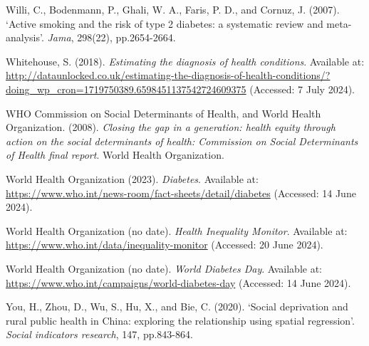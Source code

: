 \begin{Reference}
\begin{flushleft}
Willi, C., Bodenmann, P., Ghali, W. A., Faris, P. D., and Cornuz, J. (2007). `Active smoking and the risk of type 2 diabetes: a systematic review and meta-analysis'. \textit{Jama}, 298(22), pp.2654-2664.
\end{flushleft}
\vspace{2pt}


\begin{flushleft}
Whitehouse, S. (2018). \textit{Estimating the diagnosis of health conditions}. Available at: \url{http://dataunlocked.co.uk/estimating-the-diagnosis-of-health-conditions/?doing_wp_cron=1719750389.6598451137542724609375} (Accessed: 7 July 2024).
\end{flushleft}
\vspace{2pt}


\begin{flushleft}
WHO Commission on Social Determinants of Health, and World Health Organization. (2008). \textit{Closing the gap in a generation: health equity through action on the social determinants of health: Commission on Social Determinants of Health final report}. World Health Organization.
\end{flushleft}
\vspace{2pt}


\begin{flushleft}
World Health Organization (2023). \textit{Diabetes}. Available at: \url{https://www.who.int/news-room/fact-sheets/detail/diabetes} (Accessed: 14 June 2024).
\end{flushleft}
\vspace{2pt}


\begin{flushleft}
World Health Organization (no date). \textit{Health Inequality Monitor}. Available at: \url{https://www.who.int/data/inequality-monitor} (Accessed: 20 June 2024).
\end{flushleft}
\vspace{2pt}


\begin{flushleft}
World Health Organization (no date). \textit{World Diabetes Day}. Available at: \url{https://www.who.int/campaigns/world-diabetes-day} (Accessed: 14 June 2024).
\end{flushleft}
\vspace{2pt}


\begin{flushleft}
You, H., Zhou, D., Wu, S., Hu, X., and Bie, C. (2020). `Social deprivation and rural public health in China: exploring the relationship using spatial regression'. \textit{Social indicators research}, 147, pp.843-864.
\end{flushleft}
\vspace{2pt}







\end{Reference}












